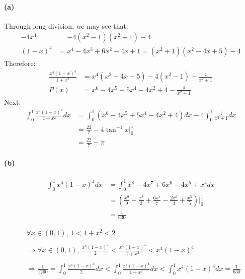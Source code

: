 \documentclass{article}
\begin{document}
\paragraph*{(a)}
Through long division, we may see that:
$$\begin{aligned}
    -4x^4 &= -4(x^2-1)(x^2+1) - 4 \\
    (1-x)^4 &= x^4 - 4x^3 + 6x^2 - 4x + 1 = (x^2+1)(x^2-4x+5) - 4
\end{aligned}$$
Therefore:
$$\begin{aligned}
    \frac{x^4(1-x)^4}{1+x^2} &= x^4(x^2-4x+5) - 4(x^2-1) - \frac{4}{x^2+1} \\
    P(x) &= x^6 - 4x^5 + 5x^4 - 4x^2 +4 - \frac{4}{x^2+1}
\end{aligned}$$
Next:
$$\begin{aligned}
    \int_0^1 \frac{x^4(1-x)^4}{1+x^2} dx &= \int_0^1 (x^6 - 4x^5 + 5x^4 - 4x^2 +4) dx - 4\int_0^1 \frac{1}{x^2+1} dx \\
    &= \frac{22}{7} - 4\tan^{-1}x \bigg|_0^1 \\
    &= \frac{22}{7} - \pi
\end{aligned}$$

\paragraph*{(b)}
$$\begin{aligned}
    \int_{0}^{1} x^4(1-x)^4 dx &= \int_{0}^{1} x^8-4x^7+6x^6-4x^5+x^4 dx \\
    &= (\frac{x^9}{9}-\frac{x^8}{2}+\frac{6x^7}{7}-\frac{2x^6}{3}+\frac{x^5}{5})\bigg|_0^1 \\
    &= \frac{1}{630}
\end{aligned}$$

$$\begin{aligned}
    &\forall x \in (0,1) ,\, 1 < 1+x^2 < 2 \\\\
    &\Rightarrow \forall x \in (0,1) ,\, \frac{x^4(1-x)^4}{2} < \frac{x^4(1-x)^4}{1+x^2} < x^4(1-x)^4 \\\\
    &\Rightarrow \frac{1}{1260} = \int_{0}^{1} \frac{x^4(1-x)^4}{2} dx < \int_0^1 \frac{x^4(1-x)^4}{1+x^2} dx < \int_{0}^{1} x^4(1-x)^4 dx = \frac{1}{630}
\end{aligned}$$

\section{} %
\end{document}
